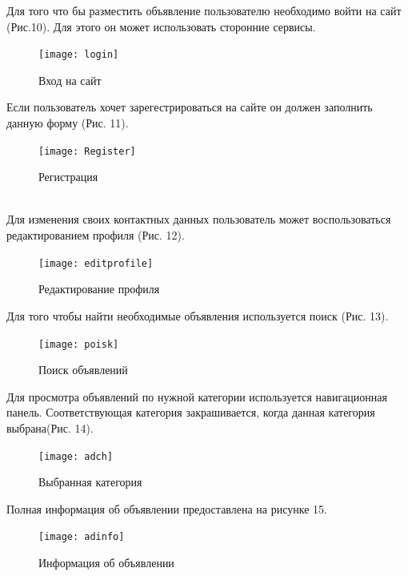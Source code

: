\documentclass[14pt,a4paper]{extreport}
\begin{document}
	Для того что бы разместить объявление пользователю необходимо войти на сайт (Рис.10). Для этого он может использовать сторонние сервисы.\par
	\begin{figure}[h]
	\begin{center}
	\texttt{[image: login]}
	\caption{Вход на сайт}
	\end{center}
	\end{figure}  

	Если пользователь хочет зарегестрироваться на сайте он должен заполнить данную форму (Рис. 11).\par
	\begin{figure}[h!]
	\begin{center}
	\texttt{[image: Register]}
	\caption{Регистрация}
	\end{center}
	\end{figure}  
	~\\

	Для изменения своих контактных данных пользователь может воспользоваться редактированием профиля (Рис. 12).\par
	\begin{figure}[h!]
	\begin{center}
	\texttt{[image: editprofile]}
	\caption{Редактирование профиля}
	\end{center}
	\end{figure}  	

	Для того чтобы найти необходимые объявления используется поиск (Рис. 13).\par
	\begin{figure}[h]
	\begin{center}
	\texttt{[image: poisk]}
	\caption{Поиск объявлений}
	\end{center}
	\end{figure}  

	Для просмотра объявлений по нужной категории используется навигационная панель. Соответствующая категория закрашивается, когда данная категория выбрана(Рис. 14).\par
	\begin{figure}[h]
	\begin{center}
	\texttt{[image: adch]}
	\caption{Выбранная категория}
	\end{center}
	\end{figure}  

	Полная информация об объявлении предоставлена на рисунке 15.\par
	\begin{figure}[h!]
	\begin{center}
	\texttt{[image: adinfo]}
	\caption{Информация об объявлении}
	\end{center}
	\end{figure}  
	~\\~\\~\\~\\~\\	~\\~\\~\\~\\~\\
\end{document}
